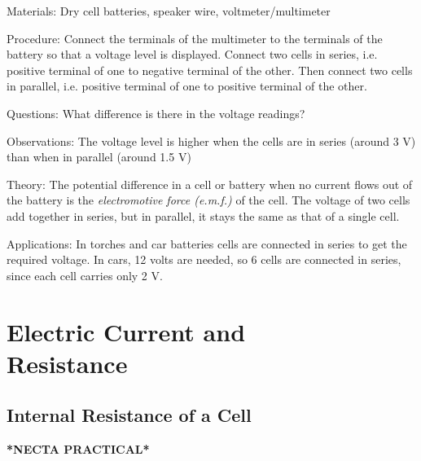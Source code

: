 \begin{multicols}{2}
\begin{description*}
\item[Materials:]{Dry cell batteries, speaker wire, voltmeter/multimeter}
\item[Procedure:]{Connect the terminals of the multimeter to the terminals of the battery so that a voltage level is displayed. Connect two cells in series, i.e. positive terminal of one to negative terminal of the other. Then connect two cells in parallel, i.e. positive terminal of one to positive terminal of the other.}
\item[Questions:]{What difference is there in the voltage readings?}
\item[Observations:]{The voltage level is higher when the cells are in series (around 3 V) than when in parallel (around 1.5 V)}
\item[Theory:]{The potential difference in a cell or battery when no current flows out of the battery is the \emph{electromotive force (e.m.f.)} of the cell. The voltage of two cells add together in series, but in parallel, it stays the same as that of a single cell.}
\item[Applications:]{In torches and car batteries cells are connected in series to get the required voltage. In cars, 12 volts are needed, so 6 cells are connected in series, since each cell carries only 2 V.}
\end{description*}

\vfill
\columnbreak


\section*{Electric Current and \hfill \\ Resistance}


\subsection{Internal Resistance of a Cell}  
\textbf{*NECTA PRACTICAL*}


\end{multicols}
